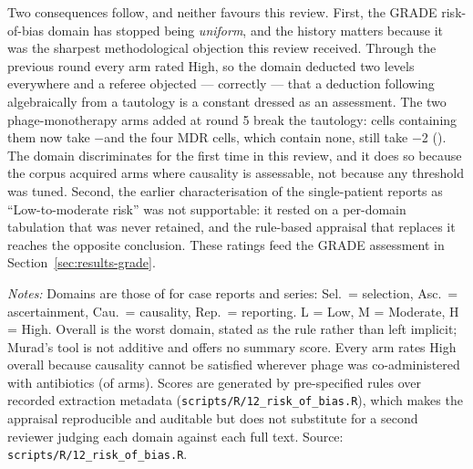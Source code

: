 Two consequences follow, and neither favours this review. First, the GRADE risk-of-bias domain has stopped being \emph{uniform}, and the history matters because it was the sharpest methodological objection this review received. Through the previous round every arm rated High, so the domain deducted two levels everywhere and a referee objected --- correctly --- that a deduction following algebraically from a tautology is a constant dressed as an assessment. The two phage-monotherapy arms added at round 5 break the tautology: cells containing them now take $-$\GradeRobDrop and the four MDR cells, which contain none, still take $-$2 (). The domain discriminates for the first time in this review, and it does so because the corpus acquired arms where causality is assessable, not because any threshold was tuned. Second, the earlier characterisation of the single-patient reports as ``Low-to-moderate risk'' was not supportable: it rested on a per-domain tabulation that was never retained, and the rule-based appraisal that replaces it reaches the opposite conclusion. These ratings feed the GRADE assessment in Section~\ref{sec:results-grade}.

\begin{table}[htbp]
\centering
\scriptsize
\begin{threeparttable}
\caption{Per-arm risk of bias, all \ArmsAnalysed pooling-eligible study-arms}\label{tab:rob-per-arm}

\begin{tablenotes}\scriptsize
\item \textit{Notes:} Domains are those of \textcite{Murad2018_casereports} for case reports and series: Sel.\ = selection, Asc.\ = ascertainment, Cau.\ = causality, Rep.\ = reporting. L = Low, M = Moderate, H = High. Overall is the worst domain, stated as the rule rather than left implicit; Murad's tool is not additive and offers no summary score. Every arm rates High overall because causality cannot be satisfied wherever phage was co-administered with antibiotics (\ModPhageAntibioticCombinationArms of \ArmsAnalysed arms). Scores are generated by pre-specified rules over recorded extraction metadata (\texttt{scripts/R/12\_risk\_of\_bias.R}), which makes the appraisal reproducible and auditable but does not substitute for a second reviewer judging each domain against each full text. Source: \texttt{scripts/R/12\_risk\_of\_bias.R}.
\end{tablenotes}
\end{threeparttable}
\end{table}


